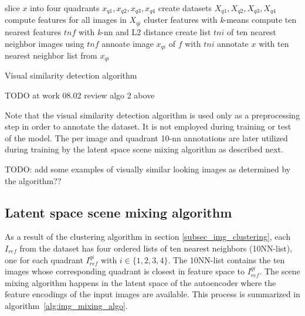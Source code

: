 \documentclass[12pt,a4paper]{article}
\begin{document}
\begin{algorithm}[H]
\DontPrintSemicolon
\LinesNumbered
{}
 {
    slice $x$ into four quadrants $x_{q1}, x_{q2}, x_{q3}, x_{q4}$
    create datasets $X_{q1}, X_{q2}, X_{q3}, X_{q4}$
}
 {
    compute features for all images in $X_{qi}$
    cluster features with \textit{k}-means
     {
         {
            compute ten nearest features $tnf$ with \textit{k}-nn and L2 distance
            create list $tni$ of ten nearest neighbor images using $tnf$
            annoate image $x_{qi}$ of $f$ with $tni$
        }
    }    
}
 {
     {
        annotate $x$ with ten nearest neighbor list from $x_{qi}$
    }
}
\caption{Visual similarity detection algorithm}\label{alg:vis_sim_det_algo}
\end{algorithm}

TODO at work 08.02 review algo 2 above

Note that the visual similarity detection algorithm is used only as a preprocessing step in order to annotate the dataset. It is not employed during training or test of the model. The per image and quadrant 10-nn annotations are later utilized during training by the latent space scene mixing algorithm as described next.

TODO: add some examples of visually similar looking images as determined by the algorithm??


\subsection{Latent space scene mixing algorithm} \label{subsec_img_mixing_algo}
As a result of the clustering algorithm in section \ref{subsec_img_clustering}, each $I_{ref}$ from the dataset has four ordered lists of ten nearest neighbors (10NN-list), one for each quadrant $I^{qi}_{ref}$ with $i \in \{1,2,3,4\}$. The 10NN-list contains the ten images whose corresponding quadrant is closest in feature space to $I^{qi}_{ref}$. The scene mixing algorithm happens in the latent space of the autoencoder where the feature encodings of the input images are available. This process is summarized in algorithm~\ref{alg:img_mixing_algo}. 
\end{document}
